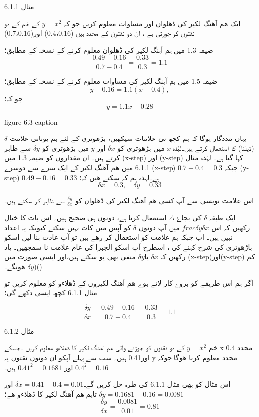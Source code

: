 مثال 6.1.1

ایک ھم آھنگ لکیر کی ڈھلوان اور مساوات معلوم کریں جو کہ \( y=x^{2}\) کے خم کے دو نقتوں کو جورتی ہے ، ان دو نقتون کے محدد ہیں (0.4،0.16) اور(0.7،0.16)

ضیمہ 1.3 میں ہم آہنگ لکیر کی ڈھلوان معلوم کرنے کے نسخہ کے مطابق؛
\[ \frac{0.49-0.16}{0.7-0.4} = \frac{0.33}{0.3} = 1.1\]

ضیمہ 1.5 میں ہم آہنگ لکیر کی مساوات معلوم کرنے کے نسخہ کے مطابق؛
\[ y-0.16 = 1.1(x-0.4), \]
جو کہ؛
\[ y=1.1x-0.28\]


figure 6.3 caption

یہاں مددگار ہوگا کہ ہم کچھ نئ علامات سیکھیں، بڑھوتری کے لئے ہم یونانی علامت \( \delta\)(ڈیلٹا) کا استعمال کرتے ہیں۔لہٰذہ \(x\)  میں بڑھوتری کو        \(\delta x\)    اور          \(y\)  میں بڑھوتری کو          \(\delta y\) سے ظاہر کرتے ہیں۔ ان مقداروں کو ضیمہ 1.3 میں (x-step) اور (y-step) کہا گیا ہے۔ لہٰذہ مثال 6.1.1 میں ھم آھنگ لکیر کے ایک سرے سے دوسرے (x-step)    \( 0.7-0.4=0.3\) جبکہ (y-step) \(0.49-0.16=0.33\) ہے۔لہٰذہ ہم کہ سکتے ھیں کہ؛
\[ \delta x = 0.3 ,\quad \delta y =0.33\]

اس علامت نویسی سے آپ کسی ھم آھنگ لکیر کی ڈھلوان کو \( \frac{\delta y}{\delta x}\) سے ظاہر کر سکتے ہیں۔ 

ایک طبقہ  \( \delta\) کی بجاۓ                 \( \Delta \)             استمعال کرتا ہے، دونوں ہی صحیح ہیں۔   
اس بات کا خیال رکھیں کہ اس \(frac{\delta y}{\delta x}\) میں آپ دونوں \(\delta\) کو آپس میں کاٹ نہیں سکتے کیوںکہ یہ اعداد نہیں ہیں۔
اب جبکہ ہم علامت کو استعمال کر رھے ہیں تو آپ عادت بنا لیں اسکو باڑھوتری کی شرح کہنے کی ، اسطرح آپ اسکو الجبرا کی عام علامت نا سمجھیں۔ یاد رکھیں کہ \(\delta x\) یا\(\delta y\)  منفی بھی یو سکتے ہیں،اور ایسی صورت میں (x-step)اور(y-step) کم ھونگے۔
\(\delta y\))()

اگر ہم اس طریقے کو بروے کار لاتے ہوے ھم آھنگ لکیروں کے ڈھلاءو کو معلوم کریں تو مثال 6.1.1 کچھ ایسی دکھے گی؛

\[ \frac{\delta y}{\delta x} = \frac{0.49-0.16}{0.7-0.4}=\frac{0.33}{0.3}=1.1 \]


مثال 6.1.2

خم \( y=x^{2}\) کے دو نقتوں کو جوڑنے والی ھم آھنگ لکیر کا ڈھلاءو معلوم کریں ۔جسکے x محدد 0.4 اور0.41 ہیں۔
سب سے پہلے آپکو ان دونوں نقتوں پہ    y
محدد معلوم کرنا ھوگا  جوکہ \( 0.4^{2}=0.16\)  اور \( 0.41^{2} =0.1681\) ہیں۔
     
     


 اس مثال کو بھی مثال 6.1.1 کی طرہ حل کریں گے۔\( \delta x = 0.41-0.4=0.01\)  اور   \(\delta y =0.1681-0.16=0.0081\)
تاہم ھم آھنگ لکیر کا ڈھلاءو ھے؛
\[ \frac{\delta y}{\delta x} =\frac{0.0081}{0.01}=0.81\]
  
